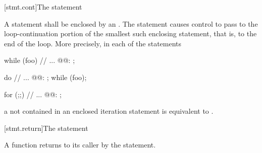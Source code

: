 [stmt.cont]{The  statement}%

\pnum
A 
statement shall be enclosed by an
%
.
The  statement
causes control to pass to the loop-continuation portion of the
smallest such enclosing statement, that is, to the end
of the loop. More precisely, in each of the statements

\begin{minipage}{.30\hsize}
\begin{codeblock}
while (foo) {
  {
    // ...
  }
@@: ;
}
\end{codeblock}
\end{minipage}
\begin{minipage}{.30\hsize}
\begin{codeblock}
do {
  {
    // ...
  }
@@: ;
} while (foo);
\end{codeblock}
\end{minipage}
\begin{minipage}{.30\hsize}
\begin{codeblock}
for (;;) {
  {
    // ...
  }
@@: ;
}
\end{codeblock}
\end{minipage}

a  not contained in an enclosed iteration statement is
equivalent to  .

[stmt.return]{The  statement}%
%
%

\pnum
A function returns to its caller by the  statement.

